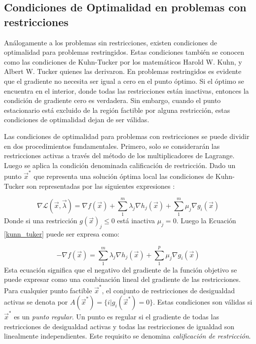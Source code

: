 \subsection{Condiciones de Optimalidad en problemas con restricciones} \label{sec: Condiciones de Optimalidad en problemas con restricciones}
Análogamente a los problemas sin restricciones, existen condiciones de optimalidad para problemas restringidos. Estas condiciones también se conocen como las condiciones de Kuhn-Tucker por los matemáticos  Harold W. Kuhn, y  Albert W. Tucker quienes las derivaron. En problemas restringidos es evidente que el gradiente no necesita ser igual a cero en el punto óptimo.  Si el óptimo se encuentra en el interior, donde todas las restricciones están inactivas, entonces la condición de gradiente cero es verdadera. Sin embargo, cuando el punto estacionario está excluido de la región factible por alguna restricción, estas condiciones de optimalidad dejan de ser válidas. 

Las condiciones de optimalidad para problemas con restricciones se puede dividir en dos procedimientos fundamentales. Primero, solo se considerarán las restricciones activas a través del método de los multiplicadores de Lagrange. Luego se aplica la condición denominada calificación de restricción. 
Dado un punto $\vec{x}^*$ que representa una solución óptima local las condiciones de Kuhn-Tucker son representadas por las siguientes expresiones \cite{arora_optimization:_2015}:

\begin{equation}
\nabla \mathcal{L} (\vec{x},\vec{\lambda})= \nabla f(\vec{x})+ \sum_{1}^m \lambda_j  \nabla h_j(\vec{x})+ \sum_{1}^m \mu_j  \nabla g_i(\vec{x})
\label{kunn_tuker}
\end{equation}
Donde si una restricción $g(\vec{x})_j\leq 0$ está inactiva $\mu_j =0$. Luego la Ecuación \ref{kunn_tuker} puede ser expresa como:  

\begin{equation}
-\nabla f(\vec{x})=  \sum_{1}^m \lambda_j  \nabla h_j(\vec{x})+ \sum_{1}^p \mu_j  \nabla g_i(\vec{x})
\label{kunn_tuker2}
\end{equation}
Esta ecuación significa que el negativo del gradiente de la función objetivo se puede expresar como una combinación lineal del gradiente de las restricciones. Para cualquier punto factible $\vec{x}^*$, el conjunto de restricciones de desigualdad activas se denota por $  A(\vec{x}^*) = \big\{  i|g_i(\vec{x}^*)=0 \big\} $.
Estas condiciones son válidas si $\vec{x}^*$ es un \textit{punto regular}. Un punto es regular si el gradiente de todas las restricciones de desigualdad activas y todas las restricciones de igualdad son linealmente independientes. Este requisito se denomina \textit{calificación de restricción}. 

